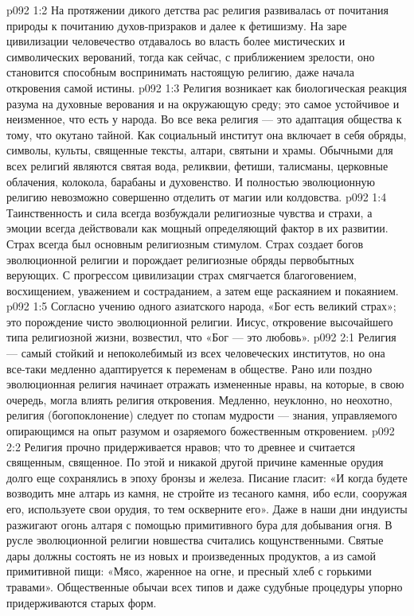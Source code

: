 \vs p092 1:2 На протяжении дикого детства рас религия развивалась от почитания природы к почитанию духов\hyp{}призраков и далее к фетишизму. На заре цивилизации человечество отдавалось во власть более мистических и символических верований, тогда как сейчас, с приближением зрелости, оно становится способным воспринимать настоящую религию, даже начала откровения самой истины.
\vs p092 1:3 Религия возникает как биологическая реакция разума на духовные верования и на окружающую среду; это самое устойчивое и неизменное, что есть у народа. Во все века религия --- это адаптация общества к тому, что окутано тайной. Как социальный институт она включает в себя обряды, символы, культы, священные тексты, алтари, святыни и храмы. Обычными для всех религий являются святая вода, реликвии, фетиши, талисманы, церковные облачения, колокола, барабаны и духовенство. И полностью эволюционную религию невозможно совершенно отделить от магии или колдовства.
\vs p092 1:4 Таинственность и сила всегда возбуждали религиозные чувства и страхи, а эмоции всегда действовали как мощный определяющий фактор в их развитии. Страх всегда был основным религиозным стимулом. Страх создает богов эволюционной религии и порождает религиозные обряды первобытных верующих. С прогрессом цивилизации страх смягчается благоговением, восхищением, уважением и состраданием, а затем еще раскаянием и покаянием.
\vs p092 1:5 Согласно учению одного азиатского народа, «Бог есть великий страх»; это порождение чисто эволюционной религии. Иисус, откровение высочайшего типа религиозной жизни, возвестил, что «Бог --- это любовь».
\vs p092 2:1 Религия --- самый стойкий и непоколебимый из всех человеческих институтов, но она все\hyp{}таки медленно адаптируется к переменам в обществе. Рано или поздно эволюционная религия начинает отражать измененные нравы, на которые, в свою очередь, могла влиять религия откровения. Медленно, неуклонно, но неохотно, религия (богопоклонение) следует по стопам мудрости --- знания, управляемого опирающимся на опыт разумом и озаряемого божественным откровением.
\vs p092 2:2 Религия прочно придерживается нравов; что  то древнее и считается священным, священное. По этой и никакой другой причине каменные орудия долго еще сохранялись в эпоху бронзы и железа. Писание гласит: «И когда будете возводить мне алтарь из камня, не стройте из тесаного камня, ибо если, сооружая его, используете свои орудия, то тем оскверните его». Даже в наши дни индуисты разжигают огонь алтаря с помощью примитивного бура для добывания огня. В русле эволюционной религии новшества считались кощунственными. Святые дары должны состоять не из новых и произведенных продуктов, а из самой примитивной пищи: «Мясо, жаренное на огне, и пресный хлеб с горькими травами». Общественные обычаи всех типов и даже судубные процедуры упорно придерживаются старых форм.
